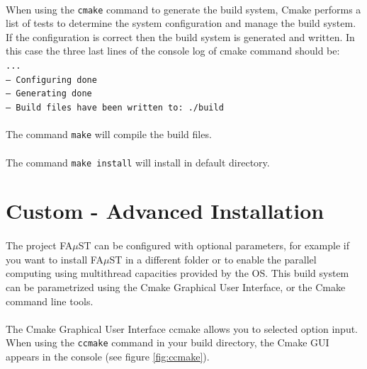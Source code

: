 \paragraph{}When using the \texttt{cmake} command to generate the build system, Cmake performs a list of tests to determine the system configuration and manage the build system. If the configuration is correct then the build system is generated and written. In this case the three last lines of the console log of cmake command should be: \\
\texttt{... \\
-- Configuring done \\
-- Generating done \\
-- Build files have been written to: ./build}

\paragraph{}The command \texttt{make} will compile the build files.

\paragraph{}The command \texttt{make install} will install in default directory.



\section{Custom - Advanced Installation}\label{sec:UnixCustomInstall}

\paragraph{}The project FA$\mu$ST can be configured with optional parameters, for example if you want to install FA$\mu$ST in a different folder or to enable the parallel computing using multithread capacities provided by the OS. This build system can be parametrized using the Cmake Graphical User Interface, or the Cmake command line tools. 

\paragraph{}The Cmake Graphical User Interface ccmake allows you to selected option input. When using the \texttt{ccmake} command in your build directory, the Cmake GUI appears in the console (see figure \ref{fig:ccmake}).

